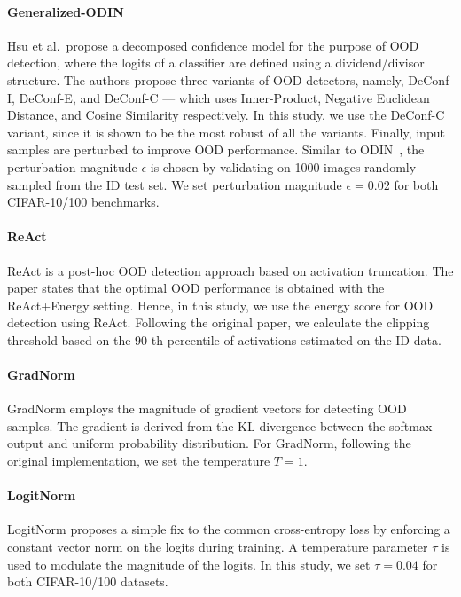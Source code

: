 \documentclass[letterpaper]{article} %
\def\etal{{et al.\xspace}}
\theoremstyle{plain}
\theoremstyle{definition}
\theoremstyle{remark}
\begin{document}
\paragraph{Generalized-ODIN \cite{hsu2020generalized}} Hsu \etal~propose a decomposed confidence model for the purpose of OOD detection, where the logits of a classifier are defined using a dividend/divisor structure. The authors propose three variants of OOD detectors, namely, DeConf-I, DeConf-E, and DeConf-C --- which uses Inner-Product, Negative Euclidean Distance, and Cosine Similarity respectively. In this study, we use the DeConf-C variant, since it is shown to be the most robust of all the variants. Finally, input samples are perturbed to improve OOD performance. Similar to ODIN~\cite{liang2018enhancing}, the perturbation magnitude $\epsilon$ is chosen by validating on 1000 images randomly sampled from the ID test set. We set perturbation magnitude $\epsilon = 0.02$ for both CIFAR-10/100 benchmarks.

\paragraph{ReAct~\cite{sun2021react}} ReAct is a post-hoc OOD detection approach based on activation truncation. The paper states that the optimal OOD performance is obtained with the ReAct+Energy setting. Hence, in this study, we use the energy score for OOD detection using ReAct. Following the original paper, we calculate the clipping threshold based on the $90$-th percentile of activations estimated on the ID data.

\paragraph{GradNorm~\cite{huang2021importance}} GradNorm employs the magnitude of gradient vectors for detecting OOD samples. The gradient is derived from the KL-divergence between the softmax output and uniform probability distribution. For GradNorm, following the original implementation, we set the temperature $T = 1$.

\paragraph{LogitNorm~\cite{wei2022mitigating}} LogitNorm proposes a simple fix to the common cross-entropy loss by enforcing a constant vector norm on the logits during training. A temperature parameter $\tau$ is used to modulate the magnitude of the logits. In this study, we set $\tau = 0.04$ for both CIFAR-10/100 datasets.
\end{document}
